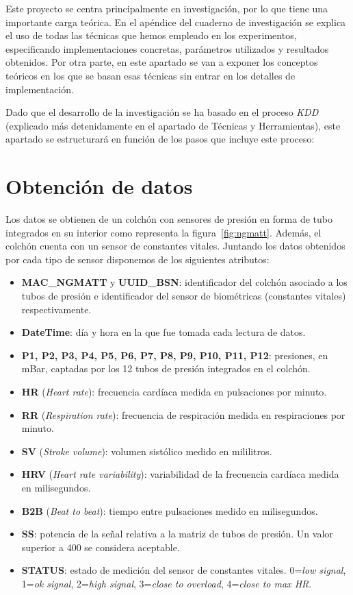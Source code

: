\label{conceptos teoricos}

Este proyecto se centra principalmente en investigación, por lo que tiene una importante carga teórica. En el apéndice del cuaderno de investigación se explica el uso de todas las técnicas que hemos empleado en los experimentos, especificando implementaciones concretas, parámetros utilizados y resultados obtenidos. Por otra parte, en este apartado se van a exponer los conceptos teóricos en los que se basan esas técnicas sin entrar en los detalles de implementación.  

Dado que el desarrollo de la investigación se ha basado en el proceso \textit{KDD} (explicado más detenidamente en el apartado de Técnicas y Herramientas), este apartado se estructurará en función de los pasos que incluye este proceso: 

\section{Obtención de datos}

Los datos se obtienen de un colchón con sensores de presión en forma de tubo integrados en su interior como representa la figura~\ref{fig:ngmatt}. Además, el colchón cuenta con un sensor de constantes vitales. Juntando los datos obtenidos por cada tipo de sensor disponemos de los siguientes atributos: 

\begin{itemize}
	\item \textbf{MAC\_NGMATT} y \textbf{UUID\_BSN}: identificador del colchón asociado a los tubos de presión e identificador del sensor de biométricas (constantes vitales) respectivamente. 
	\item \textbf{DateTime}: día y hora en la que fue tomada cada lectura de datos. 
	\item \textbf{P1, P2, P3, P4, P5, P6, P7, P8, P9, P10, P11, P12}: presiones, en mBar, captadas por los 12 tubos de presión integrados en el colchón. 
	\item \textbf{HR} (\textit{Heart rate}): frecuencia cardíaca medida en pulsaciones por minuto. 
	\item \textbf{RR} (\textit{Respiration rate}): frecuencia de respiración medida en respiraciones por minuto. 
	\item \textbf{SV} (\textit{Stroke volume}): volumen sistólico medido en mililitros. 
	\item \textbf{HRV} (\textit{Heart rate variability}): variabilidad de la frecuencia cardíaca medida en milisegundos. 
	\item \textbf{B2B} (\textit{Beat to beat}): tiempo entre pulsaciones medido en milisegundos. 
	\item \textbf{SS}: potencia de la señal relativa a la matriz de tubos de presión. Un valor superior a 400 se considera aceptable. 
	\item \textbf{STATUS}: estado de medición del sensor de constantes vitales. 0=\textit{low signal}, 1=\textit{ok signal}, 2=\textit{high signal}, 3=\textit{close to overload}, 4=\textit{close to max HR}. 
\end{itemize}

